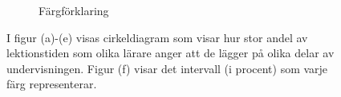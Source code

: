 \begin{figure}
\begin{subfigure}[b]{0.2\textwidth}
        \caption{Färgförklaring}
        \label{fig:five over x}
    \end{subfigure}
    \caption{I figur (a)-(e) visas cirkeldiagram som visar hur stor andel av lektionstiden som olika lärare anger att de lägger på olika delar av undervisningen. Figur (f) visar det intervall (i procent) som varje färg representerar.}
    \label{fig:three graphs}
\end{figure}
